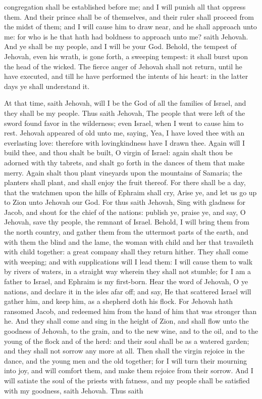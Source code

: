 congregation shall be established before me; and I will punish all that oppress them. And their prince shall be of themselves, and their ruler shall proceed from the midst of them; and I will cause him to draw near, and he shall approach unto me: for who is he that hath had boldness to approach unto me? saith Jehovah. And ye shall be my people, and I will be your God.  Behold, the tempest of Jehovah, even his wrath, is gone forth, a sweeping tempest: it shall burst upon the head of the wicked. The fierce anger of Jehovah shall not return, until he have executed, and till he have performed the intents of his heart: in the latter days ye shall understand it. 

At that time, saith Jehovah, will I be the God of all the families of Israel, and they shall be my people. Thus saith Jehovah, The people that were left of the sword found favor in the wilderness; even Israel, when I went to cause him to rest. Jehovah appeared of old unto me, saying, Yea, I have loved thee with an everlasting love: therefore with lovingkindness have I drawn thee. Again will I build thee, and thou shalt be built, O virgin of Israel: again shalt thou be adorned with thy tabrets, and shalt go forth in the dances of them that make merry. Again shalt thou plant vineyards upon the mountains of Samaria; the planters shall plant, and shall enjoy the fruit thereof. For there shall be a day, that the watchmen upon the hills of Ephraim shall cry, Arise ye, and let us go up to Zion unto Jehovah our God.  For thus saith Jehovah, Sing with gladness for Jacob, and shout for the chief of the nations: publish ye, praise ye, and say, O Jehovah, save thy people, the remnant of Israel. Behold, I will bring them from the north country, and gather them from the uttermost parts of the earth, and with them the blind and the lame, the woman with child and her that travaileth with child together: a great company shall they return hither. They shall come with weeping; and with supplications will I lead them: I will cause them to walk by rivers of waters, in a straight way wherein they shall not stumble; for I am a father to Israel, and Ephraim is my first-born.  Hear the word of Jehovah, O ye nations, and declare it in the isles afar off; and say, He that scattered Israel will gather him, and keep him, as a shepherd doth his flock. For Jehovah hath ransomed Jacob, and redeemed him from the hand of him that was stronger than he. And they shall come and sing in the height of Zion, and shall flow unto the goodness of Jehovah, to the grain, and to the new wine, and to the oil, and to the young of the flock and of the herd: and their soul shall be as a watered garden; and they shall not sorrow any more at all. Then shall the virgin rejoice in the dance, and the young men and the old together; for I will turn their mourning into joy, and will comfort them, and make them rejoice from their sorrow. And I will satiate the soul of the priests with fatness, and my people shall be satisfied with my goodness, saith Jehovah.  Thus saith 